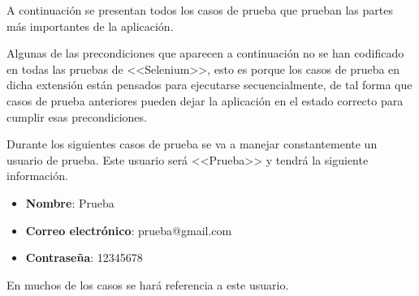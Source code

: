 A continuación se presentan todos los casos de prueba que prueban las partes más
importantes de la aplicación.

Algunas de las precondiciones que aparecen a continuación no se han codificado
en todas las pruebas de <<Selenium>>, esto es porque los casos de prueba en
dicha extensión están pensados para ejecutarse secuencialmente, de tal forma que
casos de prueba anteriores pueden dejar la aplicación en el estado correcto para
cumplir esas precondiciones.

Durante los siguientes casos de prueba se va a manejar constantemente un usuario
de prueba. Este usuario será <<Prueba>> y tendrá la siguiente información.
\begin{itemize}
    \item \textbf{Nombre}: Prueba
    \item \textbf{Correo electrónico}: prueba@gmail.com
    \item \textbf{Contraseña}: 12345678
\end{itemize}

En muchos de los casos se hará referencia a este usuario.

